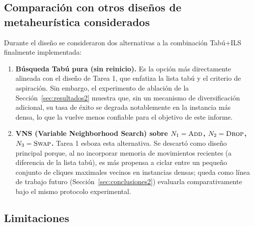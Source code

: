 \subsection{Comparación con otros diseños de metaheurística considerados}

Durante el diseño se consideraron dos alternativas a la combinación Tabú+ILS finalmente implementada:

\begin{enumerate}
    \item \textbf{Búsqueda Tabú pura (sin reinicio).} Es la opción más directamente alineada con el diseño de Tarea 1, que enfatiza la lista tabú y el criterio de aspiración. Sin embargo, el experimento de ablación de la Sección~\ref{sec:resultados2} muestra que, sin un mecanismo de diversificación adicional, su tasa de éxito se degrada notablemente en la instancia más densa, lo que la vuelve menos confiable para el objetivo de este informe.
    \item \textbf{VNS (Variable Neighborhood Search) \parencite{hansen2007vns} sobre $N_1=\textsc{Add}$, $N_2=\textsc{Drop}$, $N_3=\textsc{Swap}$.} Tarea 1 esboza esta alternativa. Se descartó como diseño principal porque, al no incorporar memoria de movimientos recientes (a diferencia de la lista tabú), es más propensa a ciclar entre un pequeño conjunto de cliques maximales vecinos en instancias densas; queda como línea de trabajo futuro (Sección~\ref{sec:conclusiones2}) evaluarla comparativamente bajo el mismo protocolo experimental.
\end{enumerate}

\subsection{Limitaciones}

